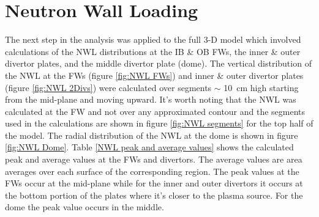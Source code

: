 \documentclass[12pt, letterpaper]{elsarticle}
\begin{document}
\section{Neutron Wall Loading} \label{Neutron Wall Loading}
The next step in the analysis was applied to the full 3-D model which involved calculations of the NWL distributions at the IB \& OB FWs, the inner \& outer divertor plates, and the middle divertor plate (dome). The vertical distribution of the NWL at the FWs (figure \ref{fig:NWL FWs}) and inner \& outer divertor plates (figure \ref{fig:NWL 2Divs}) were calculated over segments $\sim$ \SI{10}{cm} high starting from the mid-plane and moving upward. It's worth noting that the NWL was calculated at the FW and not over any approximated contour and the segments used in the calculations are shown in figure \ref{fig:NWL segments} for the top half of the model. The radial distribution of the NWL at the dome is shown in figure \ref{fig:NWL Dome}. Table \ref{NWL peak and average values} shows the calculated peak and average values at the FWs and divertors. The average values are area averages over each surface of the corresponding region. The peak values at the FWs occur at the mid-plane while for the inner and outer divertors it occurs at the bottom portion of the plates where it's closer to the plasma source. For the dome the peak value occurs in the middle.  
\end{document}
